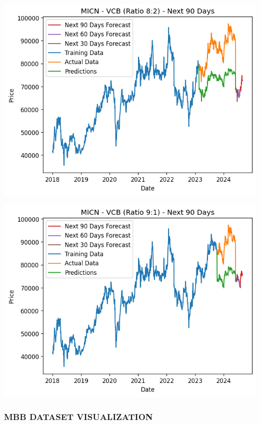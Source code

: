 \documentclass[conference]{IEEEtran}
\begin{document}
\begin{minipage}{0.23\textwidth}
    \centering
    \includegraphics[width=\linewidth]{images/MICN/MICN_VCB_82.png}
    \label{fig:image1}
\end{minipage}
\hfill
\begin{minipage}{0.23\textwidth}
    \centering
    \includegraphics[width=\linewidth]{images/MICN/MICN_VCB_91.png}
    \label{fig:image2}
\end{minipage}





\subsubsection{MBB DATASET VISUALIZATION}
\end{document}
